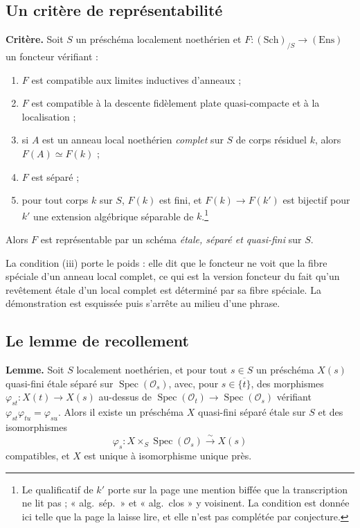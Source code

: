 \documentclass[11pt,a4paper]{article}
\begin{document}
\subsection*{Un critère de représentabilité}

\textbf{Critère.} Soit $S$ un préschéma localement noethérien et
$F : (\mathrm{Sch})_{/S} \to (\mathrm{Ens})$ un foncteur vérifiant :

\begin{enumerate}
  \item[(i)] $F$ est compatible aux limites inductives d'anneaux ;
  \item[(ii)] $F$ est compatible à la descente fidèlement plate quasi-compacte
    et à la localisation ;
  \item[(iii)] si $A$ est un anneau local noethérien \emph{complet} sur $S$ de
    corps résiduel $k$, alors $F(A) \simeq F(k)$ ;
  \item[(iv)] $F$ est séparé ;
  \item[(v)] pour tout corps $k$ sur $S$, $F(k)$ est fini, et
    $F(k) \to F(k')$ est bijectif pour $k'$ une extension algébrique séparable
    de $k$.\footnote{Le qualificatif de $k'$ porte sur la page une mention
    biffée que la transcription ne lit pas ; « alg.\ sép.\ » et « alg.\ clos »
    y voisinent. La condition est donnée ici telle que la page la laisse lire,
    et elle n'est pas complétée par conjecture.}
\end{enumerate}

Alors $F$ est représentable par un schéma \emph{étale, séparé et quasi-fini}
sur $S$.

La condition (iii) porte le poids : elle dit que le foncteur ne voit
que la fibre spéciale d'un anneau local complet, ce qui est la version
foncteur du fait qu'un revêtement étale d'un local complet est déterminé par sa
fibre spéciale. La démonstration est esquissée puis s'arrête au milieu d'une
phrase.

\subsection*{Le lemme de recollement}

\textbf{Lemme.} Soit $S$ localement noethérien, et pour tout $s \in S$ un
préschéma $X(s)$ quasi-fini étale séparé sur
$\operatorname{Spec}(\mathcal{O}_{s})$, avec, pour $s \in \overline{\{t\}}$,
des morphismes $\varphi_{st} : X(t) \to X(s)$ au-dessus de
$\operatorname{Spec}(\mathcal{O}_{t}) \to \operatorname{Spec}(\mathcal{O}_{s})$
vérifiant $\varphi_{st}\varphi_{tu} = \varphi_{su}$. Alors il existe un
préschéma $X$ quasi-fini séparé étale sur $S$ et des isomorphismes
\[
  \varphi_{s} : X \times_{S} \operatorname{Spec}(\mathcal{O}_{s})
  \xrightarrow{\ \sim\ } X(s)
\]
compatibles, et $X$ est unique à isomorphisme unique près.
\end{document}
